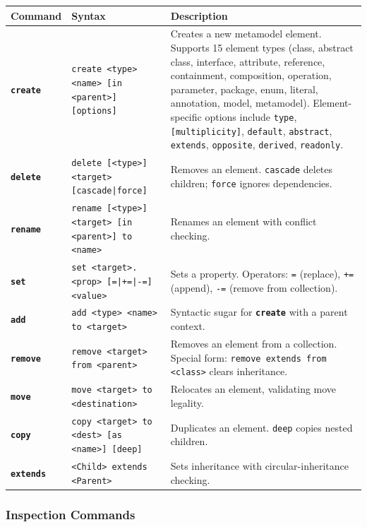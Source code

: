 \documentclass[11pt,a4paper]{article}
\newcommand{\kw}[1]{\texttt{\textbf{#1}}}
\begin{document}
\begin{center}
\small
\begin{tabularx}{\textwidth}{@{}llX@{}}
\toprule
\textbf{Command} & \textbf{Syntax} & \textbf{Description} \\
\midrule
\kw{create} & \texttt{create <type> <name> [in <parent>] [options]} &
    Creates a new metamodel element. Supports 15 element types (class,
    abstract class, interface, attribute, reference, containment,
    composition, operation, parameter, package, enum, literal, annotation,
    model, metamodel). Element-specific options include \texttt{type},
    \texttt{[multiplicity]}, \texttt{default}, \texttt{abstract},
    \texttt{extends}, \texttt{opposite}, \texttt{derived}, \texttt{readonly}. \\
\addlinespace
\kw{delete} & \texttt{delete [<type>] <target> [cascade|force]} &
    Removes an element. \texttt{cascade} deletes children;
    \texttt{force} ignores dependencies. \\
\addlinespace
\kw{rename} & \texttt{rename [<type>] <target> [in <parent>] to <name>} &
    Renames an element with conflict checking. \\
\addlinespace
\kw{set} & \texttt{set <target>.<prop> [=|+=|-=] <value>} &
    Sets a property. Operators: \texttt{=} (replace), \texttt{+=}
    (append), \texttt{-=} (remove from collection). \\
\addlinespace
\kw{add} & \texttt{add <type> <name> to <target>} &
    Syntactic sugar for \kw{create} with a parent context. \\
\addlinespace
\kw{remove} & \texttt{remove <target> from <parent>} &
    Removes an element from a collection. Special form:
    \texttt{remove extends from <class>} clears inheritance. \\
\addlinespace
\kw{move} & \texttt{move <target> to <destination>} &
    Relocates an element, validating move legality. \\
\addlinespace
\kw{copy} & \texttt{copy <target> to <dest> [as <name>] [deep]} &
    Duplicates an element. \texttt{deep} copies nested children. \\
\addlinespace
\kw{extends} & \texttt{<Child> extends <Parent>} &
    Sets inheritance with circular-inheritance checking. \\
\bottomrule
\end{tabularx}
\end{center}

\subsubsection{Inspection Commands}
\end{document}
